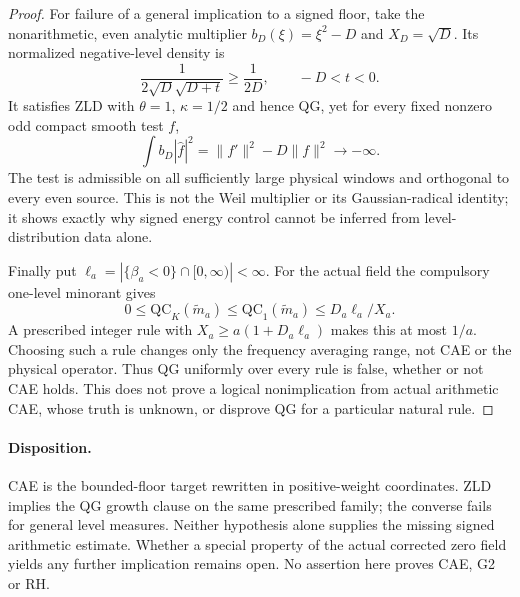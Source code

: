\begin{proof}
For failure of a general implication to a signed floor, take the
nonarithmetic, even analytic multiplier $b_D(\xi)=\xi^2-D$ and
$X_D=\sqrt D$. Its normalized negative-level density is
\[
 \frac{1}{2\sqrt D\sqrt{D+t}}\ge\frac1{2D},
              \qquad -D<t<0.
\]
It satisfies ZLD with $\theta=1$, $\kappa=1/2$ and hence QG, yet
for every fixed nonzero odd compact smooth test $f$,
\[
 \int b_D|\widehat f|^2=\|f'\|^2-D\|f\|^2\longrightarrow-\infty.
\]
The test is admissible on all sufficiently large physical windows
and orthogonal to every even source. This is not the Weil multiplier
or its Gaussian-radical identity; it shows exactly why signed
energy control cannot be inferred from level-distribution data alone.

Finally put $\ell_a=|\{\beta_a<0\}\cap[0,\infty)|<\infty$.
For the actual field the compulsory one-level minorant gives
\begin{equation}\label{eq:v151-cutoff-dilution}
 0\le\mathrm{QC}_K(\widetilde m_a)
 \le\mathrm{QC}_1(\widetilde m_a)\le D_a\ell_a/X_a.
\end{equation}
A prescribed integer rule with $X_a\ge a(1+D_a\ell_a)$ makes
this at most $1/a$. Choosing such a rule changes only the frequency
averaging range, not CAE or the physical operator. Thus QG uniformly over every rule is false, whether or not CAE
holds. This does not prove a logical nonimplication from actual
arithmetic CAE, whose truth is unknown, or disprove QG for a
particular natural rule.
\end{proof}

\paragraph{Disposition.}
CAE is the bounded-floor target rewritten in positive-weight coordinates.
ZLD implies the QG growth clause on the same prescribed family; the
converse fails for general level measures. Neither hypothesis alone
supplies the missing signed arithmetic estimate. Whether a special
property of the actual corrected zero field yields any further
implication remains open. No assertion here proves CAE, G2 or RH.
